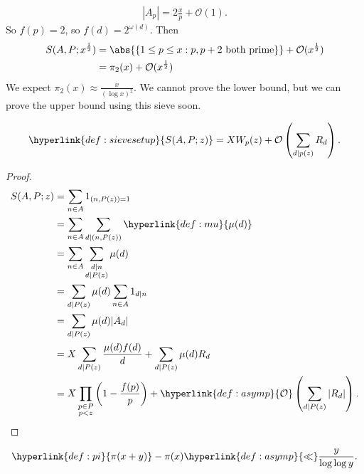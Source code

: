 \documentclass{article}
\newcommand{\bigO}{\mathcal{O}}
\begin{document}
\begin{eg}
\begin{enumerate}[label=(\arabic*)]
      \begin{align*}
        |A_p| = 2\frac{x}{p} + \bigO(1).
      \end{align*}
      So $f(p) = 2$, so $f(d) = 2^{\omega(d)}$.
      Then
      \begin{align*}
        S(A,P; x^{\frac{1}{2}}) &= \abs{\{1 \leq p \leq x : p, p+2 \text{ both prime}\}} + \bigO(x^{\frac{1}{2}}) \\
                                &= \pi_2(x) + \bigO(x^{\frac 12})
      \end{align*}
      We expect $\pi_2(x) \approx \frac{x}{(\log x)^2}$. We cannot prove the lower bound, but we can prove the upper bound using this sieve soon.
  \end{enumerate}
\end{eg}
\begin{nthm}\label{thm:2.1}
  \begin{equation*}
    \hyperlink{def:sievesetup}{S(A,P; z)} = X W_p(z) + \bigO\left(\sum_{d \mid p(z)} R_d\right).
  \end{equation*}
\end{nthm}
\begin{proof}
  \begin{align*}
    S(A,P;z) &= \sum_{n \in A} 1_{(n, P(z)) = 1} \\
             &= \sum_{n \in A} \sum_{d \mid (n, P(z))}\hyperlink{def:mu}{ \mu(d)} \\
             &= \sum_{n \in A} \sum_{\substack{d \mid n \\ d \mid P(z)}} \mu(d) \\
             &= \sum_{d \mid P(z)} \mu(d) \sum_{n \in A} 1_{d \mid n} \\
             &= \sum_{d \mid P(z)} \mu(d) |A_d| \\
             &= X \sum_{d \mid P(z)} \frac{\mu(d) f(d)}{d} + \sum_{d \mid P(z)} \mu(d) R_d \\
             &= X \prod_{\substack{p \in P \\ p < z}} \left(1 - \frac{f(p)}{p}\right) + \hyperlink{def:asymp}{\bigO}\left(\sum_{d \mid P(z)} |R_d|\right). \qedhere
  \end{align*}
\end{proof}
\begin{ncor}\label{cor:2.2}
  \begin{equation*}
    \hyperlink{def:pi}{\pi(x+y)} - \pi(x) \hyperlink{def:asymp}{\ll} \frac{y}{\log \log y}.
  \end{equation*}
\end{ncor}
\end{document}

